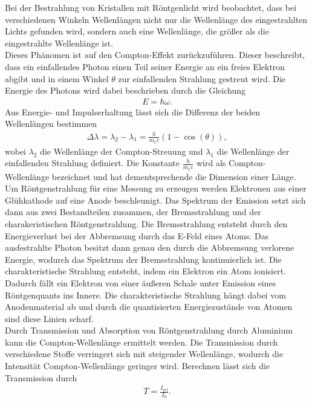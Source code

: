 Bei der Bestrahlung von Kristallen mit Röntgenlicht wird beobachtet, dass
bei verschiedenen Winkeln Wellenlängen nicht nur die Wellenlänge des eingestrahlten Lichts gefunden wird,
sondern auch eine Wellenlänge, die größer als die eingestrahlte Wellenlänge ist.\\
Dieses Phänomen ist auf den Compton-Effekt zurückzuführen. Dieser beschreibt,
dass ein einfallendes Photon einen Teil seiner Energie an ein freies Elektron abgibt
und in einem Winkel $\theta $ zur einfallenden Strahlung gestreut wird. Die Energie des Photons wird 
dabei beschrieben durch die Gleichung 
\begin{align}
    E  = \hbar \omega \label{eq:1}.
\end{align}
Aus Energie- und Impulserhaltung lässt sich die Differenz der beiden Wellenlängen bestimmen \cite{V603}
\begin{align}
    \Delta \lambda = \lambda _2 - \lambda _1 = \frac{h}{m_e c}(1-\cos(\theta))  \label{eq:2},
\end{align}
wobei $\lambda _2 $ die Wellenlänge der Compton-Streuung und $\lambda _1 $ die Wellenlänge
der einfallenden Strahlung definiert. Die Konstante $\frac{h}{m_e c}$ wird als
Compton-Wellenlänge bezeichnet und hat dementsprechende die Dimension einer Länge.\\
Um Röntgenstrahlung für eine Messung zu erzeugen werden Elektronen aus einer 
Glühkathode  auf eine Anode beschleunigt. Das Spektrum der Emission
setzt sich dann aus zwei Bestandteilen zusammen, der Bremsstrahlung und
der charakeristischen Röntgenstrahlung.
Die Bremsstrahlung entsteht durch den Energieverlust bei der Abbremsung durch
das E-Feld eines Atoms. Das ausfestrahlte Photon besitzt dann genau den
durch die Abbremsung verlorene Energie, wodurch das Spektrum der Bremsstrahlung kontinuierlich
ist. 
Die charakteristische Strahlung entsteht, indem ein Elektron ein Atom ionisiert.
Dadurch fällt ein Elektron von einer äußeren Schale unter Emission eines 
Röntgenquants ins Innere. Die charakteristische Strahlung hängt
dabei vom Anodenmaterial ab und durch die quantisierten Energiezustände von Atomen
sind diese Linien scharf.\\
Durch Transmission und Absorption von Röntgenstrahlung durch Aluminium kann
die Compton-Wellenlänge ermittelt werden. Die Transmission durch verschiedene Stoffe
verringert sich mit steigender Wellenlänge, wodurch die Intensität
Compton-Wellenlänge geringer wird. Berechnen lässt sich die Transmission durch
\begin{align}
    T=\frac{I_{\text{ref}}}{I_0} \label{eq:3}.
\end{align}

